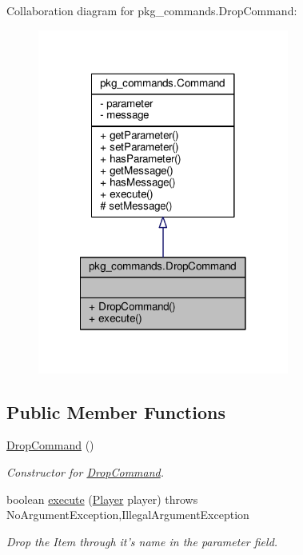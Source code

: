 Collaboration diagram for pkg\-\_\-commands.\-Drop\-Command\-:\nopagebreak
\begin{figure}[H]
\begin{center}
\leavevmode
\includegraphics[width=234pt]{classpkg__commands_1_1DropCommand__coll__graph}
\end{center}
\end{figure}
\subsection*{Public Member Functions}
\begin{DoxyCompactItemize}
\item 
\hyperlink{classpkg__commands_1_1DropCommand_a2e755d7f4b0735183553d5d97d624f0c}{Drop\-Command} ()
\begin{DoxyCompactList}\small\item\em Constructor for \hyperlink{classpkg__commands_1_1DropCommand}{Drop\-Command}. \end{DoxyCompactList}\item 
boolean \hyperlink{classpkg__commands_1_1DropCommand_a742e37b2d2dd4e111130811ee2f4dd0b}{execute} (\hyperlink{classpkg__world_1_1Player}{Player} player)  throws No\-Argument\-Exception,\-Illegal\-Argument\-Exception 
\begin{DoxyCompactList}\small\item\em Drop the Item through it's name in the parameter field. \end{DoxyCompactList}\end{DoxyCompactItemize}
